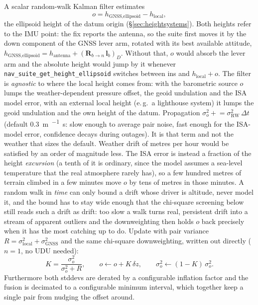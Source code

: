 \documentclass[11pt,a4paper]{article}
\newcommand{\dt}{\Delta t}
\newcommand{\code}[1]{\texttt{#1}}
\begin{document}
A scalar random-walk Kalman filter estimates
\begin{equation}
  o = h_{\text{GNSS,ellipsoid}} - h_{\text{local}},
\end{equation}
the ellipsoid height of the datum origin (\S\ref{sec:heightsystems}).
Both heights refer to the IMU point: the fix reports the antenna, so the
suite first moves it by the down component of the GNSS lever arm, rotated
with its best available attitude,
$h_{\text{GNSS,ellipsoid}} = h_{\text{antenna}} + (\mathbf{R}_{b\to n}\,\mathbf{l}_b)_D$.
Without that, $o$ would absorb the lever arm and the absolute height would
jump by it whenever \code{nav\_\allowbreak{}suite\_\allowbreak{}get\_\allowbreak{}height\_\allowbreak{}ellipsoid}
switches between ins and $h_{\text{local}} + o$.
The filter is \emph{agnostic} to where the local height
comes from: with the barometric source $o$ lumps the weather-dependent
pressure offset, the geoid undulation and the ISA model error, with an
external local height (e.\,g.\ a lighthouse system) it lumps the geoid
undulation and the own height of the datum. Propagation
$\sigma_o^2 \mathrel{+}= \sigma_{\text{RW}}^2\,\dt$ (default
\SI{0.3}{\metre\per\sqrt\second}: slow enough to average pair noise,
fast enough for the ISA-model error, confidence decays during outages).
It is that term and not the weather that sizes the default. Weather
drift of metres per hour would be satisfied by an order of magnitude
less. The ISA error is instead a fraction of the height \emph{excursion}
(a tenth of it is ordinary, since the model assumes a sea-level temperature
that the real atmosphere rarely has), so a few hundred metres of terrain
climbed in a few minutes move $o$ by tens of metres in those minutes. A
random walk in \emph{time} can only bound a drift whose driver is
altitude, never model it, and the bound has to stay wide enough that the
chi-square screening below still reads such a drift as drift: too slow a
walk turns real, persistent drift into a stream of apparent outliers and
the downweighting then holds $o$ back precisely when it has the most
catching up to do. Update with pair variance $R = \sigma_{\text{local}}^2
+ \sigma_{\text{GNSS}}^2$ and the same chi-square downweighting,
written out directly ($n{=}1$, no UDU needed):
\begin{equation}
  K = \frac{\sigma_o^2}{\sigma_o^2 + R}, \qquad
  o \leftarrow o + K\,\delta z, \qquad
  \sigma_o^2 \leftarrow (1 - K)\,\sigma_o^2 .
\end{equation}
Furthermore both stddevs are derated by a configurable inflation factor
and the fusion is decimated to a configurable minimum interval, which
together keep a single pair from nudging the offset around.
\end{document}
